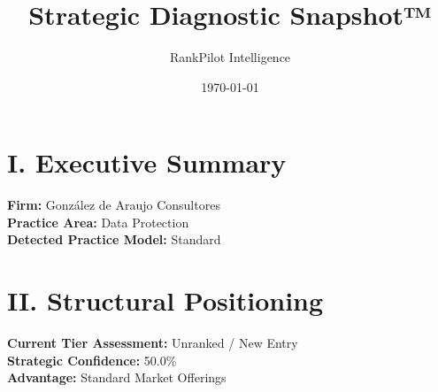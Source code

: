 \documentclass[11pt]{article}
\title{\textbf{Strategic Diagnostic Snapshot™}}
\author{RankPilot Intelligence}
\date{\today}
\begin{document}
\maketitle

\section*{I. Executive Summary}
\textbf{Firm:} González de Araujo Consultores \\
\textbf{Practice Area:} Data Protection \\
\textbf{Detected Practice Model:} Standard

\section*{II. Structural Positioning}
\textbf{Current Tier Assessment:} Unranked / New Entry \\
\textbf{Strategic Confidence:} 50.0\% \\
\textbf{Advantage:} Standard Market Offerings
\end{document}
